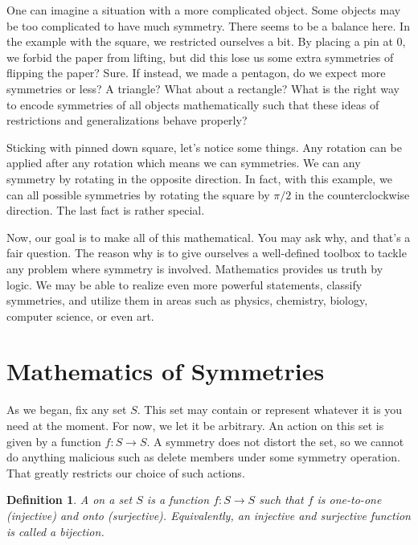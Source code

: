 \documentclass{article}
\theoremstyle{indented}
\newtheorem{definition}{Definition}
\begin{document}
One can imagine a situation with a more complicated object. Some objects may be too complicated to have much symmetry. There seems to be a balance here. In the example with the square, we restricted ourselves a bit. By placing a pin at $0$, we forbid the paper from lifting, but did this lose us some extra symmetries of flipping the paper? Sure. If instead, we made a pentagon, do we expect more symmetries or less? A triangle? What about a rectangle? What is the right way to encode symmetries of all objects mathematically such that these ideas of restrictions and generalizations behave properly?

Sticking with pinned down square, let's notice some things. Any rotation can be applied after any rotation which means we can  symmetries. We can  any symmetry by rotating in the opposite direction. In fact, with this example, we can  all possible symmetries by rotating the square by $\pi/2$ in the counterclockwise direction. The last fact is rather special.

Now, our goal is to make all of this mathematical. You may ask why, and that's a fair question. The reason why is to give ourselves a well-defined toolbox to tackle any problem where symmetry is involved. Mathematics provides us truth by logic. We may be able to realize even more powerful statements, classify symmetries, and utilize them in areas such as physics, chemistry, biology, computer science, or even art.

\section{Mathematics of Symmetries}

As we began, fix any set $S$. This set may contain or represent whatever it is you need at the moment. For now, we let it be arbitrary. An action on this set is given by a function $f\colon S \to S$. A symmetry does not distort the set, so we cannot do anything malicious such as delete members under some symmetry operation. That greatly restricts our choice of such actions.

\begin{definition}
A  on a set $S$ is a function $f\colon S \to S$ such that $f$ is one-to-one (injective) and onto (surjective). Equivalently, an injective and surjective function is called a bijection.
\end{definition}
\end{document}
